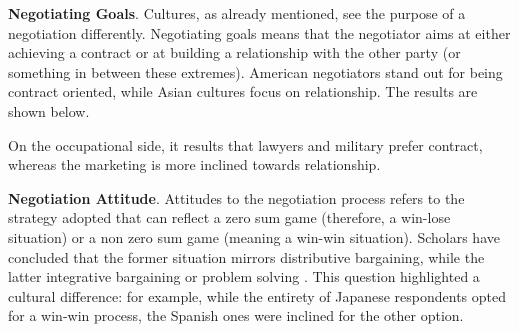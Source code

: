 \documentclass[../main.tex]{subfiles}
\begin{document}
\textbf{Negotiating Goals}. Cultures, as already mentioned, see the purpose of a negotiation differently. Negotiating goals means that the negotiator aims at either achieving a contract or at building a relationship with the other party (or something in between these extremes). American negotiators stand out for being contract oriented, while Asian cultures focus on relationship. The results are shown below.

\vspace{0.3cm}
\begin{minipage}{\linewidth}
    \label{negotiationGoalPerCountry}
\end{minipage}
\vspace{0.3cm}

On the occupational side, it results that lawyers and military prefer contract, whereas the marketing is more inclined towards relationship.

\vspace{0.3cm}
\begin{minipage}{\linewidth}
    \label{negotiationGoalPerProfession}
\end{minipage}
\vspace{0.3cm}

\textbf{Negotiation Attitude}. Attitudes to the negotiation process refers to the strategy adopted that can reflect a zero sum game (therefore, a win-lose situation) or a non zero sum game (meaning a win-win situation). Scholars have concluded that the former situation mirrors distributive bargaining, while the latter integrative bargaining or problem solving \autocite[227]{1998}. This question highlighted a cultural difference: for example, while the entirety of Japanese respondents opted for a win-win process, the Spanish ones were inclined for the other option.
\end{document}
